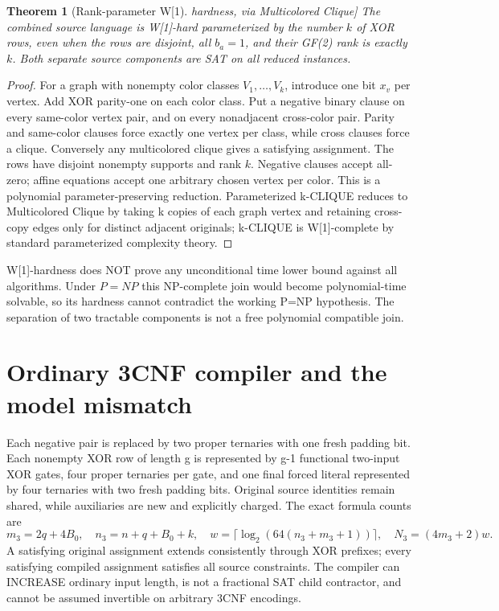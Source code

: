 \documentclass[11pt]{article}
\newtheorem{theorem}{Theorem}
\begin{document}
\begin{theorem}[Rank-parameter W[1] hardness, via Multicolored Clique]
The combined source language is W[1]-hard parameterized by the number $k$ of XOR rows, even when the rows are disjoint, all $b_a=1$, and their GF(2) rank is exactly $k$. Both separate source components are SAT on all reduced instances.
\end{theorem}
\begin{proof}
For a graph with nonempty color classes $V_1,\ldots,V_k$, introduce one bit $x_v$ per vertex. Add XOR parity-one on each color class. Put a negative binary clause on every same-color vertex pair, and on every nonadjacent cross-color pair. Parity and same-color clauses force exactly one vertex per class, while cross clauses force a clique. Conversely any multicolored clique gives a satisfying assignment. The rows have disjoint nonempty supports and rank $k$. Negative clauses accept all-zero; affine equations accept one arbitrary chosen vertex per color. This is a polynomial parameter-preserving reduction. Parameterized k-CLIQUE reduces to Multicolored Clique by taking k copies of each graph vertex and retaining cross-copy edges only for distinct adjacent originals; k-CLIQUE is W[1]-complete by standard parameterized complexity theory.
\end{proof}
W[1]-hardness does NOT prove any unconditional time lower bound against all algorithms. Under $P=NP$ this NP-complete join would become polynomial-time solvable, so its hardness cannot contradict the working P=NP hypothesis. The separation of two tractable components is not a free polynomial compatible join.

\section{Ordinary 3CNF compiler and the model mismatch}
Each negative pair is replaced by two proper ternaries with one fresh padding bit. Each nonempty XOR row of length g is represented by g-1 functional two-input XOR gates, four proper ternaries per gate, and one final forced literal represented by four ternaries with two fresh padding bits. Original source identities remain shared, while auxiliaries are new and explicitly charged. The exact formula counts are
\[
m_3=2q+4B_0,\quad n_3=n+q+B_0+k,\quad
w=\lceil\log_2(64(n_3+m_3+1))\rceil,\quad N_3=(4m_3+2)w.
\]
A satisfying original assignment extends consistently through XOR prefixes; every satisfying compiled assignment satisfies all source constraints. The compiler can INCREASE ordinary input length, is not a fractional SAT child contractor, and cannot be assumed invertible on arbitrary 3CNF encodings.
\end{document}
